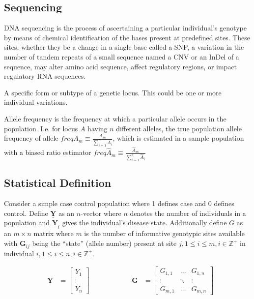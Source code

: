 \subsection{Sequencing}

DNA sequencing is the process of ascertaining a particular individual's genotype by means of chemical identification of the bases present at predefined sites. These sites, whether they be a change in a single base called a \ac{SNP}, a variation in the number of tandem repeats of a small sequence named a \ac{CNV} or an \ac{InDel} of a sequence, may alter amino acid sequence, affect regulatory regions, or impact regulatory \ac{RNA} sequences.

\begin{definition}[Allele]
A specific form or subtype of a genetic locus. This could be one or more individual variations. 
\end{definition}

\begin{rem}
Allele frequency is the frequency at which a particular allele occurs in the population. I.e. for locus $A$ having $n$ different alleles, the true population allele frequency of allele $freq A_m \equiv \frac{A_m}{ \sum^n_{i=1} A_i}$, which is estimated in a sample population with a biased ratio estimator $freq \hat{A}_m \equiv \frac{\hat{A}_m}{ \sum^n_{i=1} \hat{A}_i}$  
\end{rem}

\subsection{Statistical Definition}

Consider a simple case control population where 1 defines case and 0 defines control. Define $\underline{\mathbf{Y}}$ as an $n$-vector where $n$ denotes the number of individuals in a population and $\underline{\mathbf{Y}}_i$ gives the individual's disease state. Additionally define $G$ as an $m \times n$ matrix where $m$ is the number of informative genotypic sites available with $\mathbf{G}_{ij}$ being the ``state'' (allele number) present at site $j, 1 \leq i \leq m, i \in \mathbb{Z}^+$ in individual $i, 1 \leq i \leq n, i \in \mathbb{Z}^+$.

$$ \begin{aligned} &\mathbf{\underline{Y}} &= \begin{bmatrix} Y_1 \\ \vdots \\ Y_n \end{bmatrix} \, \, \, \, \, \, \, \,\, \, \, \,\, \, \, \, \, \, \, \, \, \, \, \,\, \, \, \,\, \, \, \, &  \mathbf{G} &= \begin{bmatrix} G_{1,1} & \dots & G_{1, n} \\ \vdots & \ddots & \vdots \\ G_{m, 1} & \dots & G_{m, n} \end{bmatrix} \end{aligned} $$

